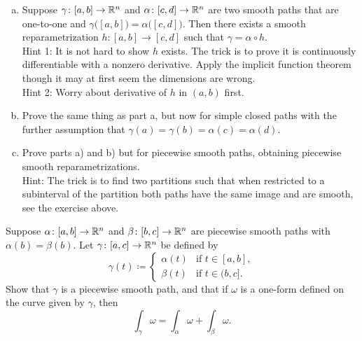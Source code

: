 \begin{exercise}
\pagebreak[3]
\leavevmode
\begin{enumerate}[a)]
\item
Suppose $\gamma \colon [a,b] \to {\mathbb{R}}^n$ and $\alpha \colon [c,d] \to {\mathbb{R}}^n$
are two smooth paths that are one-to-one and
$\gamma\bigl([a,b]\bigr) = \alpha\bigl([c,d]\bigr)$.  Then
there exists a smooth reparametrization $h \colon [a,b] \to [c,d]$
such that $\gamma = \alpha \circ h$.\\
Hint 1: It is not hard to show $h$ exists.
The trick is to prove it is continuously differentiable
with a nonzero derivative.  Apply the implicit function
theorem though it may at first seem the dimensions are wrong.\\
Hint 2: Worry about derivative of $h$ in $(a,b)$ first.
\item
Prove the same thing as part a, but now for simple closed paths with the
further assumption that $\gamma(a) = \gamma(b) = \alpha(c) = \alpha(d)$.
\item
Prove parts a) and b) but for piecewise smooth paths, obtaining
piecewise smooth reparametrizations.\\
Hint: The trick is to find two
partitions such that when restricted to a subinterval of the partition
both paths have the same image and are smooth, see the exercise above.
\end{enumerate}
\end{exercise}

\begin{exercise} 
\pagebreak[1]
Suppose $\alpha \colon [a,b] \to {\mathbb{R}}^n$ and
$\beta \colon [b,c] \to {\mathbb{R}}^n$ are piecewise smooth paths with
$\alpha(b)=\beta(b)$.  Let $\gamma \colon [a,c] \to {\mathbb{R}}^n$ be defined by
\begin{equation*}
\gamma(t) \coloneqq
\begin{cases}
\alpha(t) & \text{if } t \in [a,b], \\
\beta(t)  & \text{if } t \in (b,c].
\end{cases}
\end{equation*}
Show that $\gamma$ is a piecewise smooth path, and that if $\omega$ is a
one-form defined on the curve given by $\gamma$, then
\begin{equation*}
\int_{\gamma} \omega =
\int_{\alpha} \omega +
\int_{\beta} \omega .
\end{equation*}
\end{exercise}

